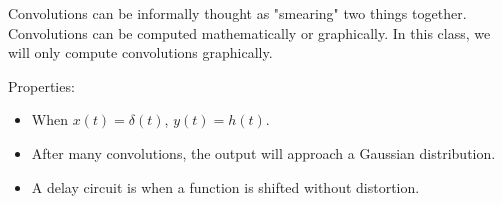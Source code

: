 Convolutions can be informally thought as "smearing" two things together. Convolutions can be computed mathematically or graphically. In this class, we will only compute convolutions graphically.

\vsp

Properties:

\begin{itemize}
    \item When $x(t) = \delta(t)$, $y(t) = h(t)$.
    \item After many convolutions, the output will approach a Gaussian distribution.
    \item A delay circuit is when a function is shifted without distortion.
\end{itemize}